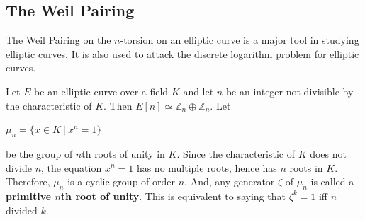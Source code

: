 \documentclass[a4paper, 12pt]{article}
\begin{document}
\subsection{The Weil Pairing}
The Weil Pairing on the $n$-torsion on an elliptic curve is a major tool in studying elliptic curves. It is also used to attack the discrete logarithm problem for elliptic curves. \par
Let $E$ be an elliptic curve over a field $K$ and let $n$ be an integer not divisible by the characteristic of $K$. Then $E[n] \simeq \mathbb{Z}_n \oplus \mathbb{Z}_n$. Let 
\begin{center} $\mu_n = \{x \in \bar{K} \: | \: x^n = 1\}$ \end{center}
be the group of $n$th roots of unity in $\bar{K}$. Since the characteristic of $K$ does not divide $n$, the equation $x^n=1$ has no multiple roots, hence has $n$ roots in $\bar{K}$. Therefore, $\mu_n$ is a cyclic group of order $n$. And, any generator $\zeta$ of $\mu_n$ is called a \textbf{primitive $n$th root of unity}. This is equivalent to saying that $\zeta^k = 1$ iff $n$ divided $k$. 
\end{document}
